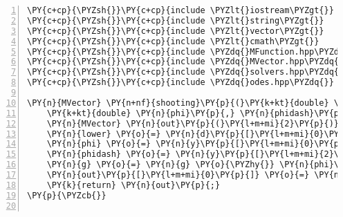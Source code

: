 \begin{Verbatim}[commandchars=\\\{\},numbers=left,firstnumber=1,stepnumber=1]
\PY{c+cp}{\PYZsh{}}\PY{c+cp}{include \PYZlt{}iostream\PYZgt{}}
\PY{c+cp}{\PYZsh{}}\PY{c+cp}{include \PYZlt{}string\PYZgt{}}
\PY{c+cp}{\PYZsh{}}\PY{c+cp}{include \PYZlt{}vector\PYZgt{}}
\PY{c+cp}{\PYZsh{}}\PY{c+cp}{include \PYZlt{}cmath\PYZgt{}}
\PY{c+cp}{\PYZsh{}}\PY{c+cp}{include \PYZdq{}MFunction.hpp\PYZdq{}}
\PY{c+cp}{\PYZsh{}}\PY{c+cp}{include \PYZdq{}MVector.hpp\PYZdq{}}
\PY{c+cp}{\PYZsh{}}\PY{c+cp}{include \PYZdq{}solvers.hpp\PYZdq{}}
\PY{c+cp}{\PYZsh{}}\PY{c+cp}{include \PYZdq{}odes.hpp\PYZdq{}}

\PY{n}{MVector} \PY{n+nf}{shooting}\PY{p}{(}\PY{k+kt}{double} \PY{n}{g}\PY{p}{,} \PY{n}{MVector} \PY{o}{\PYZam{}}\PY{n}{y}\PY{p}{,} \PY{n}{MVector} \PY{n}{d}\PY{p}{)}\PY{p}{\PYZob{}}
	\PY{k+kt}{double} \PY{n}{phi}\PY{p}{,} \PY{n}{phidash}\PY{p}{,} \PY{n}{lower}\PY{p}{,} \PY{n}{upper}\PY{p}{;}
	\PY{n}{MVector} \PY{n}{out}\PY{p}{(}\PY{l+m+mi}{2}\PY{p}{)}\PY{p}{;}
	\PY{n}{lower} \PY{o}{=} \PY{n}{d}\PY{p}{[}\PY{l+m+mi}{0}\PY{p}{]}\PY{p}{;} \PY{n}{upper} \PY{o}{=} \PY{n}{d}\PY{p}{[}\PY{l+m+mi}{1}\PY{p}{]}\PY{p}{;}
	\PY{n}{phi} \PY{o}{=} \PY{n}{y}\PY{p}{[}\PY{l+m+mi}{0}\PY{p}{]} \PY{o}{\PYZhy{}} \PY{n}{upper}\PY{p}{;} \PY{c+c1}{// check the boundary conditions}
	\PY{n}{phidash} \PY{o}{=} \PY{n}{y}\PY{p}{[}\PY{l+m+mi}{2}\PY{p}{]}\PY{p}{;}
	\PY{n}{g} \PY{o}{=} \PY{n}{g} \PY{o}{\PYZhy{}} \PY{n}{phi}\PY{o}{/}\PY{n}{phidash}\PY{p}{;}
	\PY{n}{out}\PY{p}{[}\PY{l+m+mi}{0}\PY{p}{]} \PY{o}{=} \PY{n}{g}\PY{p}{;} \PY{n}{out}\PY{p}{[}\PY{l+m+mi}{1}\PY{p}{]} \PY{o}{=} \PY{n}{phi}\PY{p}{;}
	\PY{k}{return} \PY{n}{out}\PY{p}{;}
\PY{p}{\PYZcb{}}


\end{Verbatim}
